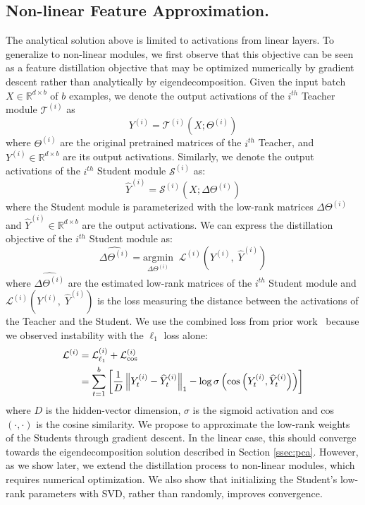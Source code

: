 \subsection{Non-linear Feature Approximation.}
The analytical solution above is limited to activations from linear layers.
To generalize to non-linear modules, we first observe that this objective can be seen as a feature distillation objective that may be optimized numerically by gradient descent rather than analytically by eigendecomposition. Given the input batch $X \in \mathbb{R}^{d \times b}$ of $b$ examples, we denote the output activations of the $i^{th}$ Teacher module $\mathcal{T}^{(i)}$ as
\begin{equation}
Y^{(i)}= \mathcal{T}^{(i)}(X; \Theta^{(i)})
\end{equation}
where $\Theta^{(i)}$ are the original pretrained matrices of the $i^{th}$ Teacher, and $Y^{(i)} \in \mathbb{R}^{d \times b}$ are its output activations. Similarly, we denote the output activations of the $i^{th}$ Student module $\mathcal{S}^{(i)}$ as:
\begin{equation}
\widehat{Y}^{(i)}= \mathcal{S}^{(i)}(X; \Delta \Theta^{(i)})
\end{equation}
where the Student module is parameterized with the low-rank matrices $\Delta \Theta^{(i)}$ and $\widehat{Y}^{(i)} \in \mathbb{R}^{d \times b}$ are the output activations. We can express the distillation objective of the $i^{th}$ Student module as:
\begin{equation}
\widehat{\Delta  \Theta^{(i)}} = \underset{{\Delta  \Theta^{(i)}}}{\mathrm{argmin}} \;\; \mathcal{L}^{(i)}(Y^{(i)}, \; \widehat{Y}^{(i)})
\end{equation}
where $\widehat{\Delta  \Theta^{(i)}}$ are the estimated low-rank matrices of the $i^{th}$ Student module and $\mathcal{L}^{(i)}(Y^{(i)}, \; \widehat{Y}^{(i)})$ is the loss measuring the distance between the activations of the Teacher and the Student.
We use the combined loss from prior work~\citep{chang2022distilhubertspeechrepresentationlearning} because we observed instability with the $\ell_1$ loss alone:
\begin{align}
\mathcal{L}^{(i)} &= \mathcal{L}^{(i)}_{\ell_1} + \mathcal{L}^{(i)}_{\cos} \\
&= \sum_{t=1}^{b} \left[ \frac{1}{D} \left\| Y^{(i)}_{t} - \widehat{Y}^{(i)}_{t} \right\|_1
- \log \sigma \left( \cos \left( Y^{(i)}_{t}, \widehat{Y}^{(i)}_{t} \right) \right) \right] \notag
\end{align}
where $D$ is the hidden-vector dimension, $\sigma$ is the sigmoid activation and cos$(\cdot, \cdot)$ is the cosine similarity. We propose to approximate the low-rank weights of the Students through gradient descent. In the linear case, this should converge towards the eigendecomposition solution described in Section \ref{ssec:pca}.
However, as we show later, we extend the distillation process to non-linear modules, which requires numerical optimization. We also show that initializing the Student's low-rank parameters with SVD, rather than randomly, improves convergence.

